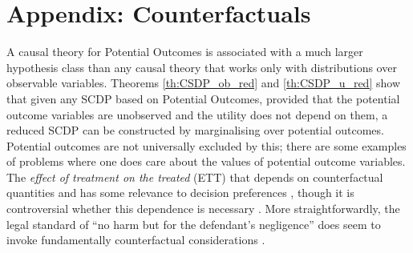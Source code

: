 
\section{Appendix: Counterfactuals}\label{app:counfac}

A causal theory for Potential Outcomes is associated with a much larger hypothesis class than any causal theory that works only with distributions over observable variables. Theorems \ref{th:CSDP_ob_red} and \ref{th:CSDP_u_red} show that given any SCDP based on Potential Outcomes, provided that the potential outcome variables are unobserved and the utility does not depend on them, a reduced SCDP can be constructed by marginalising over potential outcomes. Potential outcomes are not universally excluded by this; there are some examples of problems where one does care about the values of potential outcome variables. The \emph{effect of treatment on the treated} (ETT) that depends on counterfactual quantities and has some relevance to decision preferences \cite{rubin_estimating_1974}, though it is controversial whether this dependence is necessary \cite{geneletti2007defining}. More straightforwardly, the legal standard of ``no harm but for the defendant's negligence'' does seem to invoke fundamentally counterfactual considerations \cite{pearl_causality:_2009}.

